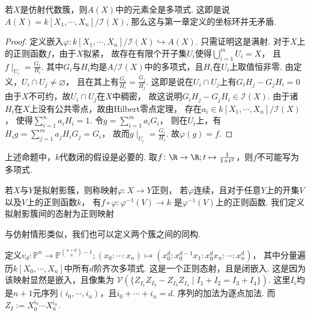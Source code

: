     \begin{theorem}
        若$X$是仿射代数簇，则$A(X)$中的元素全是多项式. 
        这即是说$A(X)=k[X_{1},\cdots,X_{n}]/\mathcal{I}(X)$,
        那么这与第一章定义的坐标环并无矛盾.
    \end{theorem}
    \begin{proof}
        定义嵌入$\varphi\colon k[X_{1},\cdots,X_{n}]/\mathcal{I}(X) \hookrightarrow A(X)$. 
        只需证明这是满射.
        对于$X$上的正则函数$f$，由于$X$拟紧，
        故存在有限个开子集$U_{i}$使得$\bigcup_{i=1}^{m} U_{i} =X$，
        且$f \mid_{U_{i}} = \frac{G_{i}}{H_{i}}$. 
        其中$G_{i}$与$H_{i}$均是$A/\mathcal{I}(X)$中的多项式，且$H_{i}$在$U_{i}$上取值恒非零. 
        由定义，$U_{i} \cap U_{j} \neq \varnothing$，
        且在其上有$\frac{G_{i}}{H_{i}}=\frac{G_{j}}{H_{j}}$. 
        这即是说在$U_{i} \cap U_{j}$上有$G_{i}H_{j}-G_{j}H_{i}=0$
        由于$X$不可约，故$U_{i} \cap U_{j}$在$X$中稠密，
        故这说明$G_{i}H_{j}-G_{j}H_{i} \in \mathcal{I}(X)$. 
        由于诸$H_{i}$在$X$上没有公共零点，故由Hilbert零点定理，
        存在$a_{i} \in k[X_{1},\cdots,X_{n}]/\mathcal{I}(X)$，
        使得$\sum_{i=1}^{n}a_{i}H_{i}=1$. 令$g=\sum_{i=1}^{m}a_{i}G_{i}$，
        则在$U_{i}$上，有$H_{i}g=\sum_{j=1}^{m}a_{j}H_{i}G_{j} = G_{i}$， 
        故而$g\mid_{U_{i}}=\frac{G_{i}}{H_{i}}$. 故$\varphi(g)=f$.
    \end{proof}

    \begin{remark}
        上述命题中，$k$代数闭的假设是必要的. 
        取$f\colon\R \rightarrow \R;t \mapsto \frac{1}{1+t^{2}}$，则$f$不可能写为多项式.
    \end{remark}

    \begin{definition}[拟射影簇的态射]
        若$X$与$Y$是拟射影簇，则称映射$\varphi\colon X \rightarrow Y$正则，
        若$\varphi$连续，且对于任意$Y$上的开集$V$以及$V$上的正则函数$k$，
        有$f \circ \varphi\colon\varphi^{-1}(V) \rightarrow k$
        是$\varphi^{-1}(V)$上的正则函数. 
        我们定义拟射影簇间的态射为正则映射
    \end{definition}

    与仿射情形类似，我们也可以定义两个簇之间的同构.

    \begin{example}[Veronese映射]
        定义$v_{d}\colon\mathbb{P}^{n} \rightarrow \mathbb{P}^{{n+d \choose n}-1};
        (x_{0}:\cdots:x_{n}) \mapsto 
        (x_{0}^{d}:x_{0}^{d-1}x_{1}:x_{0}^{d}x_{n}:\cdots:x_{n}^{d})$，
        其中分量遍历$k[X_{0},\cdots,X_{n}]$中所有$d$阶齐次多项式. 
        这是一个正则态射，且是闭嵌入. 这是因为该映射显然是嵌入，且像集为
        $\mathcal{V}(\{Z_{I_{1}}Z_{I_{2}}-Z_{I_{3}}Z_{I_{4}} \mid I_{1}+I_{2}=I_{3}+I_{4}\})$.
        这里$I_{i}$均是$n+1$元序列$(i_{0},\cdots,i_{n})$，且$i_{0}+\cdots+i_{n}=d$. 
        序列的加法为逐点加法. 而$Z_{I}:=X_{0}^{i_{0}}\cdots X_{n}^{i_{n}}$.
    \end{example}

